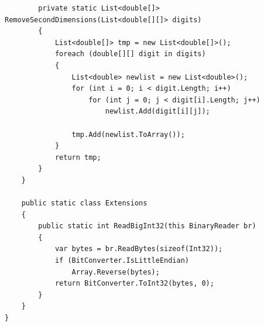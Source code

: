 \documentclass[12pt,a4paper]{article}
\begin{document}
\begin{lstlisting}
        private static List<double[]> RemoveSecondDimensions(List<double[][]> digits)
        {
            List<double[]> tmp = new List<double[]>();
            foreach (double[][] digit in digits)
            {
                List<double> newlist = new List<double>();
                for (int i = 0; i < digit.Length; i++)
                    for (int j = 0; j < digit[i].Length; j++)
                        newlist.Add(digit[i][j]);

                tmp.Add(newlist.ToArray());
            }
            return tmp;
        }
    }

    public static class Extensions
    {
        public static int ReadBigInt32(this BinaryReader br)
        {
            var bytes = br.ReadBytes(sizeof(Int32));
            if (BitConverter.IsLittleEndian)
                Array.Reverse(bytes);
            return BitConverter.ToInt32(bytes, 0);
        }
    }
}
	\end{lstlisting}
	
	\vspace{20pt}	
\end{document}

